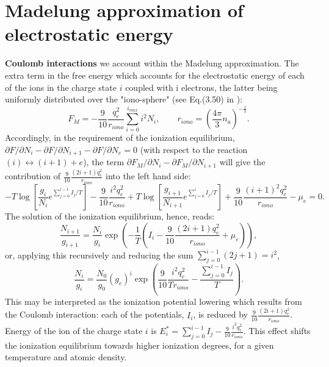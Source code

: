 \section{Madelung approximation of electrostatic energy}
{\bf Coulomb interactions} we account within the Madelung approximation. The extra term in the free energy which accounts for the
electrostatic energy of each of the ions in the charge state $i$ coupled with i electrons, the latter being uniformly
distributed over the "iono-sphere"
(see Eq.(3.50) in \cite{drake}):
\begin{equation}\label{fterm}
F_M=-\frac{9}{10} \frac{q_e^2}{r_{iono}} \sum_{i=0}^{i_{max}} i^2 N_i,\qquad
r_{iono} = \left( \frac{4 \pi}{3} n_a \right)^{-\frac13}.
\end{equation}
Accordingly, in the requirement of the ionization equilibrium, $\partial F/\partial N_i - \partial F/\partial N_{i+1} - \partial F/\partial N_e = 0$ (with respect to the reaction $(i)\leftrightarrow(i+1)+e$),
the term $\partial F_{M}/\partial N_i -\partial F_{M}/\partial N_{i+1}$ will 
give the contribution of $\frac{9}{10} \frac{(2i+1)q_e^2}{r_{iono}}$ into the left hand side:
\begin{equation}
-T \log \left[ \frac{g_i}    {N_i}     e^{\sum_{j=0}^{i-1} I_j/T} \right] - \frac{9}{10} \frac{i^2     q_e^2}{r_{iono}}
+T \log \left[ \frac{g_{i+1}}{N_{i+1}} e^{\sum_{j=0}^i     I_j/T} \right] + \frac{9}{10} \frac{(i+1)^2 q_e^2}{r_{iono}}
-\mu_e = 0.
\end{equation}
The solution of the ionization equilibrium, hence, reads:
\begin{equation}
\frac{N_{i+1}}{g_{i+1}} = \frac{N_i}{g_i} \exp\left(-\frac1T \left(I_i - \frac{9}{10} \frac{(2i+1) q_e^2}{r_{iono}} + \mu_e \right)\right),
\end{equation}
or, applying this recursively and reducing the sum $\sum_{j=0}^{i-1} (2j+1) = i^2$,
\begin{equation}\label{pfM}
\frac{N_i}{g_i}=\frac{N_0}{g_0}(g_e)^i \exp \left( \frac{9}{10} \frac{i^2 q_e^2}{T r_{iono}} -\frac{\sum_{j=0}^{i-1}I_j}T \right) .
\end{equation}
This may be interpreted as the ionization potential lowering which results from the Coulomb interaction:
each of the potentials, $I_i$, is reduced by $\frac{9}{10} \frac{(2i+1)q_e^2}{r_{iono}}$.
Energy of the ion of the charge state $i$ is $E_i^* = \sum_{j=0}^{i-1}I_j - \frac{9}{10} \frac{i^2 q_e^2}{r_{iono}}$.
This effect shifts the ionization equilibrium towards higher ionization degrees, for a given temperature and atomic density.

